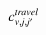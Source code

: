 

    \[\let\par\empty

    
{{{{\miitalic{c}}}\sb{{{\miitalic{v}}{\minormal{,}}{\miitalic{j}}{\minormal{,}}{\miitalic{j}}{\minormal{'}}}}\sp{{\miitalic{travel}}}}}


    \]

  